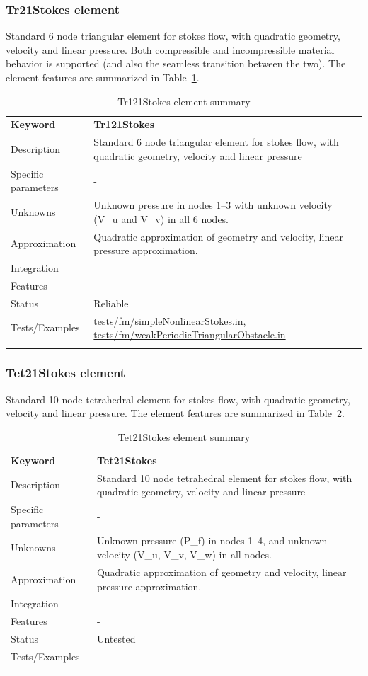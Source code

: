 \documentclass[a4paper]{article}
\newcommand{\param}[1]{\texttt{#1}} %
\newcommand{\templabel}{}%
\newcommand{\tempcaption}{}%
\newcounter{nelpar}
\newenvironment{elementsummary}[5]{%
  \gdef\tempcaption{#4}%
  \gdef\templabel{#5}%
  \setcounter{nelpar}{0}%
  \begin{center} %
    \begin{table}[!htb] %
      \begin{tabular}{|l|p{9cm}|}\hline %
        {\bf Keyword} & \bf{#1}\\ %
        {Description} & {#2}\\ %
        {Specific parameters} & {#3}\\ \hline %
}{
  \\ \hline %
      \end{tabular}%
      \caption{\tempcaption}%
      \label{\templabel}%
    \end{table}%
  \end{center}%
}
\newcommand{\elementParam}[1]{%
  \ifthenelse{\value{nelpar}>0} %
             {&{#1}}%
             {\setcounter{nelpar}{1}Parameters&{#1}}%
             \\%
}
\newcommand{\elementDescription}[2]{{#1} & {#2}\\}
\begin{document}
\subsubsection{Tr21Stokes element}
Standard 6 node triangular element for stokes flow, with quadratic geometry, velocity and linear pressure.
Both compressible and incompressible material behavior is supported (and also the seamless transition between the two).
The element features are summarized in Table~\ref{Tr121Stokessummary}.

\begin{elementsummary}{Tr121Stokes}{Standard 6 node triangular element for stokes flow, with quadratic geometry, velocity and linear pressure}{-}{Tr121Stokes element summary}{Tr121Stokessummary}
\elementDescription{Unknowns}{Unknown pressure in nodes 1--3 with unknown velocity (V\_u and V\_v) in all 6 nodes.}
\elementDescription{Approximation}{Quadratic approximation of geometry and velocity, linear pressure approximation.}
\elementDescription{Integration}{}
\elementDescription{Features}{-}
\elementDescription{Status}{Reliable}
\elementDescription{Tests/Examples}{\href{https://github.com/oofem/oofem/blob/devel/tests/fm/simpleNonlinearStokes.in}{tests/fm/simpleNonlinearStokes.in},
  \href{https://github.com/oofem/oofem/blob/devel/tests/fm/weakPeriodicTriangularObstacle.in}{tests/fm/weakPeriodicTriangularObstacle.in}
}
\end{elementsummary}

\subsubsection{Tet21Stokes element}
Standard 10 node tetrahedral element for stokes flow, with quadratic geometry, velocity and linear pressure. The element features are summarized in Table~\ref{Tet21Stokessummary}.

\begin{elementsummary}{Tet21Stokes}{Standard 10 node tetrahedral element for stokes flow, with quadratic geometry, velocity and linear pressure}{-}{Tet21Stokes element summary}{Tet21Stokessummary}
\elementDescription{Unknowns}{Unknown pressure (P\_f) in nodes 1--4, and unknown velocity (V\_u, V\_v, V\_w) in all nodes.}
\elementDescription{Approximation}{Quadratic approximation of geometry and velocity, linear pressure approximation.}
\elementDescription{Integration}{}
\elementDescription{Features}{-}
\elementDescription{Status}{Untested}
\elementDescription{Tests/Examples}{-}
\end{elementsummary}
\end{document}
